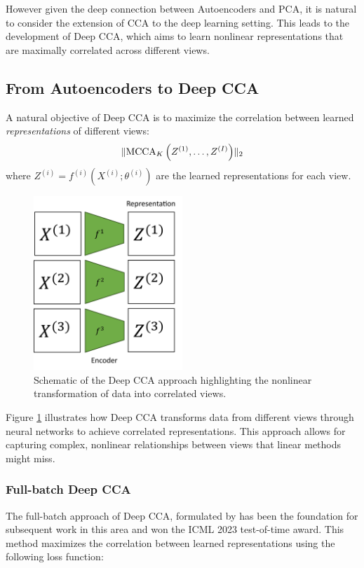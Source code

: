 However given the deep connection between Autoencoders and PCA, it is natural to consider the extension of CCA to the deep learning setting. This leads to the development of Deep CCA, which aims to learn nonlinear representations that are maximally correlated across different views.

\subsection{From Autoencoders to Deep CCA}

A natural objective of Deep CCA is to maximize the correlation between learned \textit{representations} of different views:
\begin{align}
\label{eq:DMCCA-def}
\lVert\operatorname{MCCA}_K\left(Z^{(1)}, \ldots, Z^{(I)}\right)\rVert_2
\end{align}
where $Z^{(i)} = f^{(i)}(X^{(i)}; \theta^{(i)})$ are the learned representations for each view.
\begin{figure}
\centering
\includegraphics[width=0.5\textwidth]{figures/dcca_schematic}
\caption{Schematic of the Deep CCA approach highlighting the nonlinear transformation of data into correlated views.}
\label{fig:dcca_schematic}
\end{figure}
Figure \ref{fig:dcca_schematic} illustrates how Deep CCA transforms data from different views through neural networks to achieve correlated representations. This approach allows for capturing complex, nonlinear relationships between views that linear methods might miss.

\subsubsection{Full-batch Deep CCA}
The full-batch approach of Deep CCA, formulated by \citet{andrew2013deep} has been the foundation for subsequent work in this area and won the ICML 2023 test-of-time award. This method maximizes the correlation between learned representations using the following loss function:

